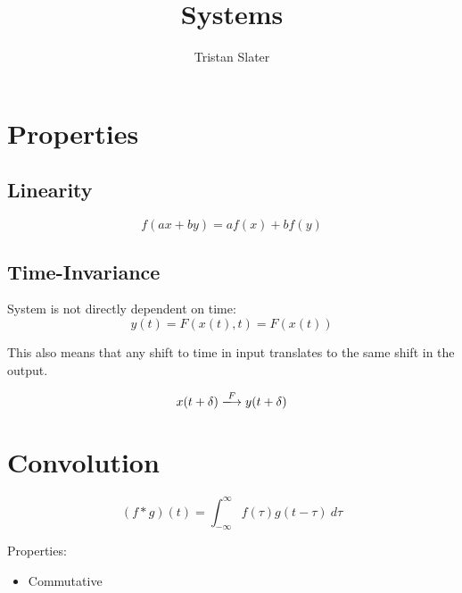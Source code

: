 \documentclass{article}
\title{Systems}
\author{Tristan Slater}
\begin{document}
    \maketitle

    \section{Properties}

    \subsection{Linearity}

    \begin{equation}
        f(ax + by) = af(x) + bf(y)
    \end{equation}

    \subsection{Time-Invariance}

    System is not directly dependent on time: \begin{equation}
        y(t) = F(x(t), t) = F(x(t))
    \end{equation}

    This also means that any shift to time in input translates to the same shift in the output.

    \begin{equation}
        x(t + \delta) \xlongrightarrow{F} y(t + \delta)
    \end{equation}

    \section{Convolution}

    \begin{equation}
        (f * g)(t) = \int_{-\infty}^\infty{f(\tau)g(t - \tau)\ d\tau}
    \end{equation}

    Properties: \begin{itemize}
        \item Commutative
    \end{itemize}
\end{document}
